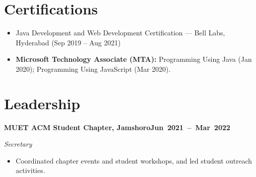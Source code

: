 \documentclass[a4paper]{article}
\newcommand{\cventry}[3]{%
  \par\addvspace{3pt}\Needspace{3.5\baselineskip}%
  \textbf{#2}\hfill\mbox{\textbf{#3}}\par\nopagebreak
  \textit{#1}\par\nopagebreak
}
\begin{document}
\section{Certifications}
\begin{itemize}
  \item Java Development and Web Development Certification --- Bell Labs, Hyderabad (Sep 2019 -- Aug 2021)
  \item \textbf{Microsoft Technology Associate (MTA):} Programming Using Java (Jan 2020); Programming Using JavaScript (Mar 2020).
\end{itemize}

\section{Leadership}
\cventry{Secretary}{MUET ACM Student Chapter, Jamshoro}{Jun 2021 -- Mar 2022}
\begin{itemize}
  \item Coordinated chapter events and student workshops, and led student outreach activities.
\end{itemize}
\end{document}
